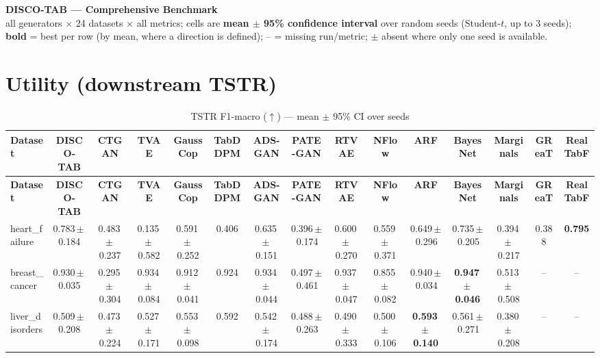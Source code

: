 \documentclass[8pt]{extarticle}
\begin{document}
\begin{center}{\Large\textbf{DISCO-TAB --- Comprehensive Benchmark}}\\[2pt]
all generators $\times$ 24 datasets $\times$ all metrics; cells are
\textbf{mean $\pm$ 95\% confidence interval} over random seeds (Student-$t$,
up to 3 seeds); \textbf{bold} = best per row (by mean, where a direction is
defined); -- = missing run/metric; $\pm$ absent where only one seed is available.
\end{center}
\scriptsize

\section*{Utility (downstream TSTR)}
\begin{longtable}{l*{14}{c}}
\caption{TSTR F1-macro ($\uparrow$) --- mean $\pm$ 95\% CI over seeds}\\
\toprule
\textbf{Dataset} & \textbf{DISCO-TAB} & \textbf{CTGAN} & \textbf{TVAE} & \textbf{GaussCop} & \textbf{TabDDPM} & \textbf{ADS-GAN} & \textbf{PATE-GAN} & \textbf{RTVAE} & \textbf{NFlow} & \textbf{ARF} & \textbf{BayesNet} & \textbf{Marginals} & \textbf{GReaT} & \textbf{RealTabF} \\
\midrule
\endfirsthead
\toprule
\textbf{Dataset} & \textbf{DISCO-TAB} & \textbf{CTGAN} & \textbf{TVAE} & \textbf{GaussCop} & \textbf{TabDDPM} & \textbf{ADS-GAN} & \textbf{PATE-GAN} & \textbf{RTVAE} & \textbf{NFlow} & \textbf{ARF} & \textbf{BayesNet} & \textbf{Marginals} & \textbf{GReaT} & \textbf{RealTabF} \\
\midrule
\endhead
\bottomrule
\endfoot
heart\_failure & 0.783\,$\pm$\,0.184 & 0.483\,$\pm$\,0.237 & 0.135\,$\pm$\,0.582 & 0.591\,$\pm$\,0.252 & 0.406 & 0.635\,$\pm$\,0.151 & 0.396\,$\pm$\,0.174 & 0.600\,$\pm$\,0.270 & 0.559\,$\pm$\,0.371 & 0.649\,$\pm$\,0.296 & 0.735\,$\pm$\,0.205 & 0.394\,$\pm$\,0.217 & 0.388 & \textbf{0.795} \\
breast\_cancer & 0.930\,$\pm$\,0.035 & 0.295\,$\pm$\,0.304 & 0.934\,$\pm$\,0.084 & 0.912\,$\pm$\,0.041 & 0.924 & 0.934\,$\pm$\,0.044 & 0.497\,$\pm$\,0.461 & 0.937\,$\pm$\,0.047 & 0.855\,$\pm$\,0.082 & 0.940\,$\pm$\,0.034 & \textbf{0.947\,$\pm$\,0.046} & 0.513\,$\pm$\,0.508 & -- & -- \\
liver\_disorders & 0.509\,$\pm$\,0.208 & 0.473\,$\pm$\,0.224 & 0.527\,$\pm$\,0.171 & 0.553\,$\pm$\,0.098 & 0.592 & 0.542\,$\pm$\,0.174 & 0.488\,$\pm$\,0.263 & 0.490\,$\pm$\,0.333 & 0.500\,$\pm$\,0.106 & \textbf{0.593\,$\pm$\,0.140} & 0.561\,$\pm$\,0.271 & 0.380\,$\pm$\,0.208 & -- & -- \\

\end{longtable}
\end{document}
